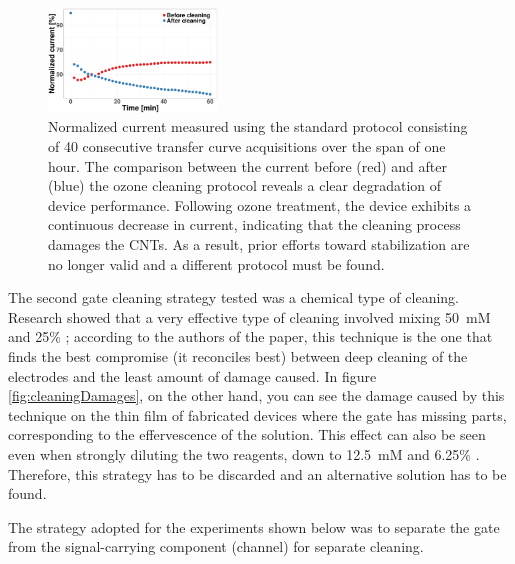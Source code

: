 \begin{figure}
    \centering
    \includegraphics[width = 0.4\textwidth]{figures/chapter4/histamine/BeforeAfterClean.pdf}
    \caption{Normalized current measured using the standard protocol consisting of 40 consecutive transfer curve acquisitions over the span of one hour. The comparison between the current before (red) and after (blue) the ozone cleaning protocol reveals a clear degradation of device performance. Following ozone treatment, the device exhibits a continuous decrease in current, indicating that the cleaning process damages the CNTs. As a result, prior efforts toward stabilization are no longer valid and a different protocol must be found.}
    \label{fig:BeforeAfterClean}
\end{figure}

The second gate cleaning strategy tested was a chemical type of cleaning. Research showed that a very effective type of cleaning involved mixing \SI{50}{mM}  and 25\%  \citep{fischerGold2009}; according to the authors of the paper, this technique is the one that finds the best compromise (it reconciles best) between deep cleaning of the electrodes and the least amount of damage caused. In figure \ref{fig:cleaningDamages}, on the other hand, you can see the damage caused by this technique on the thin film of fabricated devices where the gate has missing parts, corresponding to the effervescence of the solution. This effect can also be seen even when strongly diluting the two reagents, down to \SI{12.5}{mM}  and 6.25\% . Therefore, this strategy has to be discarded and an alternative solution has to be found.

The strategy adopted for the experiments shown below was to separate the gate from the signal-carrying component (channel) for separate cleaning.

